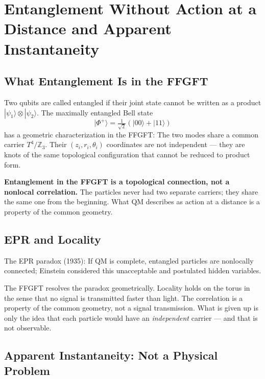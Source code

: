 \chapter{Entanglement Without Action at a Distance and Apparent Instantaneity}
\label{ch:verschraenkung}

\section{What Entanglement Is in the FFGFT}

Two qubits are called entangled if their joint state cannot be written as a
product $|\psi_1\rangle\otimes|\psi_2\rangle$.
The maximally entangled Bell state
\begin{equation}
  |\Phi^+\rangle = \tfrac{1}{\sqrt2}(|00\rangle+|11\rangle)
\end{equation}
has a geometric characterization in the FFGFT: The two modes
share a common carrier $T^4/\mathbb{Z}_3$. Their
$(z_i,r_i,\theta_i)$ coordinates are not independent --- they are
knots of the same topological configuration that cannot be reduced to product form.

\textbf{Entanglement in the FFGFT is a topological connection,
not a nonlocal correlation.} The particles never had two separate
carriers; they share the same one from the beginning. What QM describes as action at a distance is a property of the common geometry.

\section{EPR and Locality}

The EPR paradox (1935): If QM is complete, entangled
particles are nonlocally connected; Einstein considered this unacceptable and
postulated hidden variables.

The FFGFT resolves the paradox geometrically. Locality holds on the torus
in the sense that no signal is transmitted faster than light. The
correlation is a property of the common geometry, not a signal transmission. What is given up is only the idea that each particle would have an \emph{independent} carrier --- and that
is not observable.

\section{Apparent Instantaneity: Not a Physical Problem}

